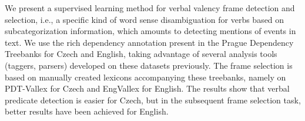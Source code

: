 We present a supervised learning method for verbal valency frame detection and selection, i.e., a specific kind of word sense disambiguation for verbs based on subcategorization information, which amounts to detecting mentions of events in text. We use the rich dependency annotation present in the Prague Dependency Treebanks for Czech and English, taking advantage of several analysis tools (taggers, parsers) developed on these datasets previously. The frame selection is based on manually created lexicons accompanying these treebanks, namely on PDT-Vallex for Czech and EngVallex for English. The results show that verbal predicate detection is easier for Czech, but in the subsequent frame selection task, better results have been achieved for English.

